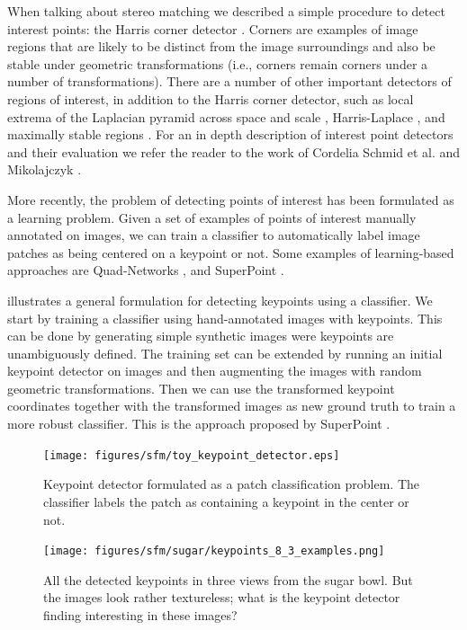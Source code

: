 When talking about stereo matching we described a simple procedure to detect interest points: the Harris corner detector \cite{Harris88}. Corners are examples of image regions that are likely to be distinct from the image surroundings and also be stable under geometric transformations (i.e., corners remain corners under a number of transformations).
There are a number of other important detectors of regions of interest, in addition to the Harris corner detector, such as local extrema of the Laplacian pyramid across space and scale \cite{Mikolajczyk2002,Lowe04}, Harris-Laplace \cite{Mikolajczyk2001}, and maximally stable regions \cite{Matas2004}.  For an in depth description of interest point detectors and their evaluation we refer the reader to the work of Cordelia Schmid et al. \cite{Schmid2000} and Mikolajczyk \cite{Mikolajczyk2002}. 


More recently, the problem of detecting points of interest has been formulated as a learning problem. Given a set of examples of points of interest manually annotated on images, we can train a classifier to automatically label image patches as being centered on a keypoint or not. Some examples of learning-based approaches are Quad-Networks \cite{Savinov2017}, and SuperPoint \cite{DeTone2018}. 


\Fig{\ref{fig:sfm:toy_keypoint_detector}} illustrates a general formulation for detecting keypoints using a classifier. We start by training a classifier using hand-annotated images with keypoints. This can be done by generating simple synthetic images were keypoints are unambiguously defined. The training set can be extended by running an initial keypoint detector on images and then augmenting the images with random geometric transformations. Then we can use the transformed keypoint coordinates together with the transformed images as new ground truth to train a more robust classifier. This is the approach proposed by SuperPoint \cite{DeTone2018}. 


\begin{figure}[t]
\centerline{
\texttt{[image: figures/sfm/toy\_keypoint\_detector.eps]}
}
\caption{Keypoint detector formulated as a patch classification problem. The classifier labels the patch as containing a keypoint in the center or not.}
\label{fig:sfm:toy_keypoint_detector}
\end{figure}


\begin{figure}[t]
\centerline{
\texttt{[image: figures/sfm/sugar/keypoints\_8\_3\_examples.png]}
}
\caption{All the detected keypoints in three views from the sugar bowl. But the images look rather textureless; what is the keypoint detector finding interesting in these images?}
\label{fig:sfm:keypoints_sugar}
\end{figure}

